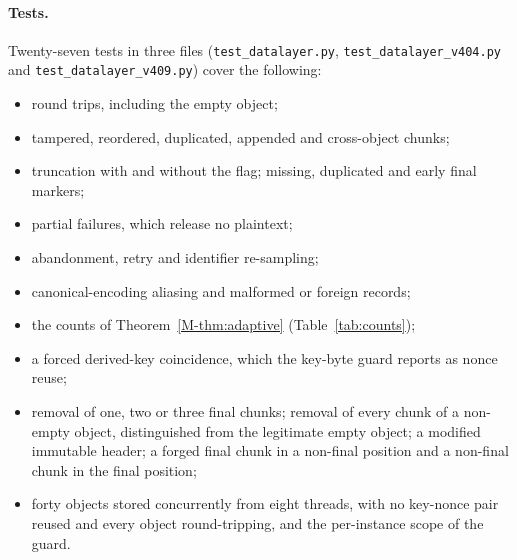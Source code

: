 \documentclass[pdflatex,sn-mathphys-num]{sn-jnl}
\newcommand{\fpath}[1]{\nolinkurl{#1}}%
\theoremstyle{plain}
\begin{document}
\paragraph{Tests.}
Twenty-seven tests in three files (\fpath{test_datalayer.py}, \fpath{test_datalayer_v404.py} and \fpath{test_datalayer_v409.py}) cover the following:
\begin{itemize}
\item round trips, including the empty object;
\item tampered, reordered, duplicated, appended and cross-object chunks;
\item truncation with and without the flag; missing, duplicated and early final markers;
\item partial failures, which release no plaintext;
\item abandonment, retry and identifier re-sampling;
\item canonical-encoding aliasing and malformed or foreign records;
\item the counts of Theorem~\ref{M-thm:adaptive} (Table~\ref{tab:counts});
\item a forced derived-key coincidence, which the key-byte guard reports as nonce reuse;
\item removal of one, two or three final chunks; removal of every chunk of a non-empty object, distinguished from the legitimate empty object; a modified immutable header; a forged final chunk in a non-final position and a non-final chunk in the final position;
\item forty objects stored concurrently from eight threads, with no key-nonce pair reused and every object round-tripping, and the per-instance scope of the guard.
\end{itemize}
\end{document}
